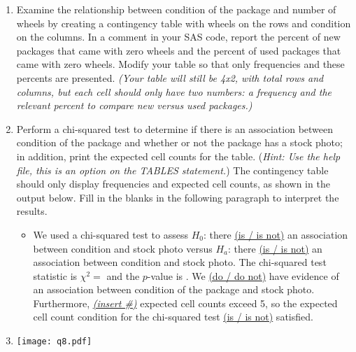 \begin{enumerate}
\item Examine the relationship between condition of the package and number of wheels by creating a contingency table with wheels on the rows and condition on the columns.  In a comment in your SAS code, report the percent of new packages that came with zero wheels and the percent of used packages that came with zero wheels.  Modify your table so that only frequencies and these percents are presented.  \emph{(Your table will still be 4x2, with total rows and columns, but each cell should only have two numbers: a frequency and the relevant percent to compare new versus used packages.)}
\item Perform a chi-squared test to determine if there is an association between condition of the package and whether or not the package has a stock photo; in addition, print the expected cell counts for the table.  (\emph{Hint: Use the help file, this is an option on the TABLES statement.}) The contingency table should only display frequencies and expected cell counts, as shown in the output below.  Fill in the blanks in the following paragraph to interpret the results.
\begin{itemize}
\item[] \doublespacing
        We used a chi-squared test to assess $H_0$: there \underline{(is / is not)} an association between condition and stock photo versus $H_a$: there \underline{(is / is not)} an association between condition and stock photo.  The chi-squared test statistic is $\chi^2=$ \bs and the $p$-value is \bs.  We \underline{(do / do not)} have evidence of an association between condition of the package and stock photo.  Furthermore, \underline{\emph{(insert \#)}} expected cell counts exceed 5, so the expected cell count condition for the chi-squared test \underline{(is / is not)} satisfied.
\end{itemize} 
\item[] 
\texttt{[image: q8.pdf]}
\emp
\end{enumerate}

